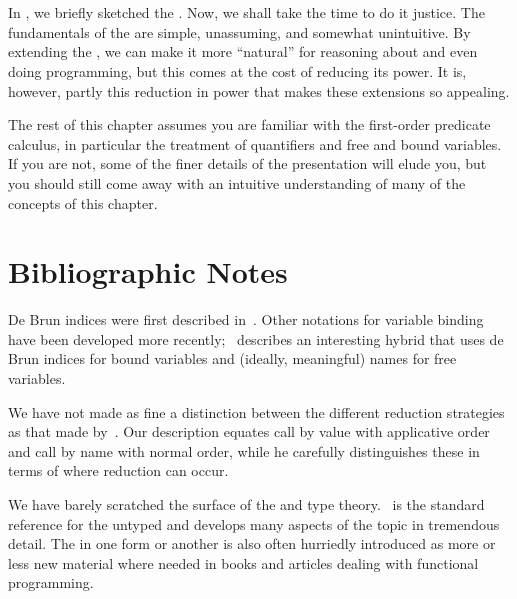 \label{functional:theory}

\section{\LambdaCalc}
In , we briefly sketched the \lambdacalc{}. Now, we shall take the time to do it justice. The fundamentals of the \lambdacalc are simple, unassuming, and somewhat unintuitive. By extending the \lambdacalc{}, we can make it more ``natural'' for reasoning about and even doing programming, but this comes at the cost of reducing its power. It is, however, partly this reduction in power that makes these extensions so appealing.

The rest of this chapter assumes you are familiar with the first-order predicate calculus, in particular the treatment of quantifiers and free and bound variables. If you are not, some of the finer details of the presentation will elude you, but you should still come away with an intuitive understanding of many of the concepts of this chapter.




\section{Bibliographic Notes}
De Bru\ij n indices were first described in~\citet{Bruijn:Lambda:1972}. Other notations for variable binding have been developed more recently; \citet{McBride:Functional:2004}~describes an interesting hybrid that uses de Bru\ij n indices for bound variables and (ideally, meaningful) names for free variables.

We have not made as fine a distinction between the different reduction strategies as that made by~\citet{Sestoft:Demonstrating:2002}. Our description equates call by value with applicative order and call by name with normal order, while he carefully distinguishes these in terms of where reduction can occur.

We have barely scratched the surface of the \lambdacalc and type theory. \citet{Barendregt:The-Lambda:1984}~is the standard reference for the untyped \lambdacalc and develops many aspects of the topic in tremendous detail. The \lambdacalc in one form or another is also often hurriedly introduced as more or less new material where needed in books and articles dealing with functional programming.

